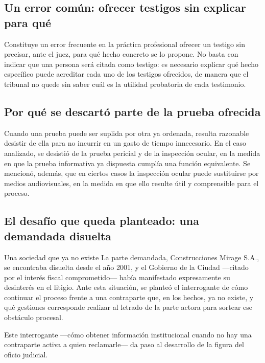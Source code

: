 \documentclass[12pt,oneside]{book}
\begin{document}
\subsection{Un error común: ofrecer testigos sin explicar para qué}

\begin{important}
Constituye un error frecuente en la práctica profesional ofrecer un testigo sin precisar, ante el juez, para qué hecho concreto se lo propone. No basta con indicar que una persona será citada como testigo: es necesario explicar qué hecho específico puede acreditar cada uno de los testigos ofrecidos, de manera que el tribunal no quede sin saber cuál es la utilidad probatoria de cada testimonio.
\end{important}

\subsection{Por qué se descartó parte de la prueba ofrecida}

Cuando una prueba puede ser suplida por otra ya ordenada, resulta razonable desistir de ella para no incurrir en un gasto de tiempo innecesario. En el caso analizado, se desistió de la prueba pericial y de la inspección ocular, en la medida en que la prueba informativa ya dispuesta cumplía una función equivalente. Se mencionó, además, que en ciertos casos la inspección ocular puede sustituirse por medios audiovisuales, en la medida en que ello resulte útil y comprensible para el proceso.

\subsection{El desafío que queda planteado: una demandada disuelta}

\begin{example}{Una sociedad que ya no existe}
La parte demandada, Construcciones Mirage S.A., se encontraba disuelta desde el año 2001, y el Gobierno de la Ciudad —citado por el interés fiscal comprometido— había manifestado expresamente su desinterés en el litigio. Ante esta situación, se planteó el interrogante de cómo continuar el proceso frente a una contraparte que, en los hechos, ya no existe, y qué gestiones corresponde realizar al letrado de la parte actora para sortear ese obstáculo procesal.
\end{example}

Este interrogante —cómo obtener información institucional cuando no hay una contraparte activa a quien reclamarle— da paso al desarrollo de la figura del oficio judicial.
\end{document}
